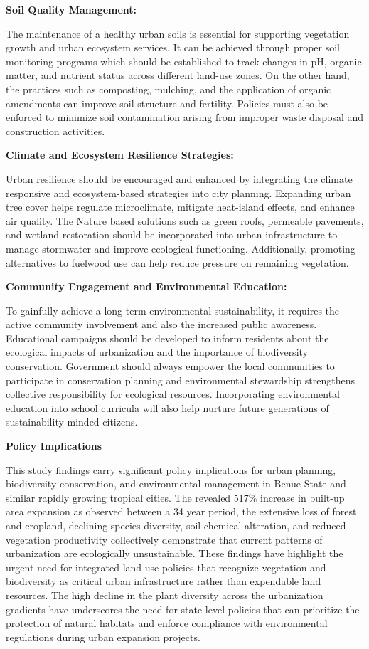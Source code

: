 \textbf{Soil Quality Management:}

The maintenance of a healthy urban soils is essential for supporting vegetation growth and urban ecosystem services. It can be achieved through proper soil monitoring programs which should be established to track changes in pH, organic matter, and nutrient status across different land-use zones. On the other hand, the practices such as composting, mulching, and the application of organic amendments can improve soil structure and fertility. Policies must also be enforced to minimize soil contamination arising from improper waste disposal and construction activities.

\textbf{Climate and Ecosystem Resilience Strategies:}

Urban resilience should be encouraged and enhanced by integrating the climate responsive and ecosystem-based strategies into city planning. Expanding urban tree cover helps regulate microclimate, mitigate heat-island effects, and enhance air quality. The Nature based solutions such as green roofs, permeable pavements, and wetland restoration should be incorporated into urban infrastructure to manage stormwater and improve ecological functioning. Additionally, promoting alternatives to fuelwood use can help reduce pressure on remaining vegetation.

\textbf{Community Engagement and Environmental Education:}

To gainfully achieve a long-term environmental sustainability, it requires the active community involvement and also the increased public awareness. Educational campaigns should be developed to inform residents about the ecological impacts of urbanization and the importance of biodiversity conservation. Government should always empower the local communities to participate in conservation planning and environmental stewardship strengthens collective responsibility for ecological resources. Incorporating environmental education into school curricula will also help nurture future generations of sustainability-minded citizens.

\textbf{Policy Implications}

This study findings carry significant policy implications for urban planning, biodiversity conservation, and environmental management in Benue State and similar rapidly growing tropical cities. The revealed 517\% increase in built-up area expansion as observed between a 34 year period, the extensive loss of forest and cropland, declining species diversity, soil chemical alteration, and reduced vegetation productivity collectively demonstrate that current patterns of urbanization are ecologically unsustainable. These findings have highlight the urgent need for integrated land-use policies that recognize vegetation and biodiversity as critical urban infrastructure rather than expendable land resources. The high decline in the plant diversity across the urbanization gradients have underscores the need for state-level policies that can prioritize the protection of natural habitats and enforce compliance with environmental regulations during urban expansion projects.

